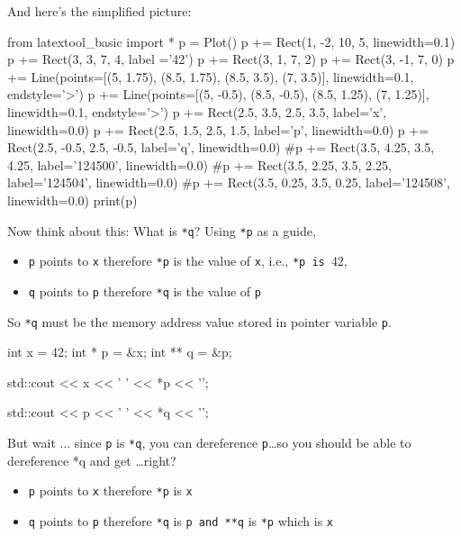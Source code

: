 And here's the simplified picture:
\begin{python}
from latextool_basic import *
p = Plot()
p += Rect(1, -2, 10, 5, linewidth=0.1)
p += Rect(3, 3, 7, 4, label ='42')
p += Rect(3, 1, 7, 2)
p += Rect(3, -1, 7, 0)
p += Line(points=[(5, 1.75), (8.5, 1.75), (8.5, 3.5), (7, 3.5)], linewidth=0.1, endstyle='>')
p += Line(points=[(5, -0.5), (8.5, -0.5), (8.5, 1.25), (7, 1.25)], linewidth=0.1, endstyle='>')
p += Rect(2.5, 3.5, 2.5, 3.5, label='x', linewidth=0.0)
p += Rect(2.5, 1.5, 2.5, 1.5, label='p', linewidth=0.0)
p += Rect(2.5, -0.5, 2.5, -0.5, label='q', linewidth=0.0)
#p += Rect(3.5, 4.25, 3.5, 4.25, label='124500', linewidth=0.0)
#p += Rect(3.5, 2.25, 3.5, 2.25, label='124504', linewidth=0.0)
#p += Rect(3.5, 0.25, 3.5, 0.25, label='124508', linewidth=0.0)
print(p)
\end{python}

Now think about this: What is \texttt{*q}? Using \texttt{*p} as a guide,

\begin{itemize}

\item
  \texttt{p} points to \texttt{x} therefore \texttt{*p} is the value of
  \texttt{x}, i.e., \texttt{*p is }42,
\item
  \texttt{q} points to \texttt{p} therefore \texttt{*q} is the value of
  \texttt{p}
\end{itemize}

So \texttt{*q} must be the memory address value stored in pointer variable \texttt{p}.

\begin{consolethree}[escapeinside=||]
int x = 42;
int * p = &x;
int ** q = &p;

std::cout << x << ' ' << *p << '\n';

std::cout << p << ' ' << *q << '\n';
\end{consolethree}
But wait ... since \texttt{p} is \texttt{*q}, you can dereference \texttt{p}\ldots so you should be able to dereference *q and get \ldots right?

\begin{itemize}

\item
  \texttt{p} points to \texttt{x} therefore \texttt{*p} is \texttt{x}
\item
  \texttt{q} points to \texttt{p} therefore \texttt{*q} is \texttt{p and **q} is
  \texttt{*p} which is \texttt{x}
\end{itemize}

